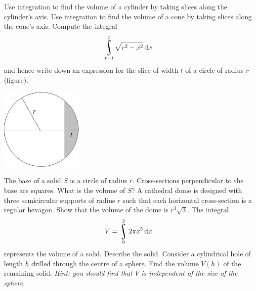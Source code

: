 \begin{questions}
  \questioE Use integration to find the volume of a cylinder by taking slices along the cylinder's axis.
  \questioE Use integration to find the volume of a cone by taking slices along the cone's axis.
  \questioS Compute the integral
            \begin{displaymath}
              \rint_{r - t}^t \sqrt{r^2 - x^2} \dif{x}
            \end{displaymath}
            and hence write down an expression for the slice of width $ t $ of a circle of radius $ r $ (figure).
            \begin{center}
              \includegraphics[width=0.3\textwidth]{cslice}
            \end{center}
  \questioS The base of a solid $ S $ is a circle of radius $ r $. Cross-sections perpendicular to the base are squares. What is the volume of $ S $?
  \questioS A cathedral dome is designed with three semicircular supports of radius $ r $ such that each horizontal cross-section is a regular hexagon.
            Show that the volume of the dome is $ r^3\sqrt{3} $.
  \questioE The integral
            \begin{displaymath}
              V = \rint_0^3 2\pi x^5 \dif{x}
            \end{displaymath}
            represents the volume of a solid. Describe the solid.
  \questioO Consider a cylindrical hole of length $ h $ drilled through the centre of a sphere. Find the volume $ V(h) $ of the remaining solid.
            \textit{Hint: you should find that $ V $ is independent of the size of the sphere.}


\end{questions}
